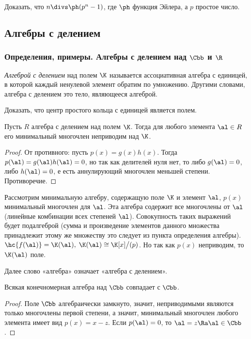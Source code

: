 \documentclass[a4paper]{article}
\begin{document}
\begin{problem}
Доказать, что $n \divs \ph(p^n-1)$, где $\ph$ функция Эйлера, а $p$ простое число.
\end{problem}

\subsection{Алгебры с делением}

\subsubsection{Определения, примеры. Алгебры с делением над $\Cbb$ и $\R$}

\begin{df}
\emph{Алгеброй с делением} над полем $\K$ называется ассоциативная алгебра с единицей, в которой каждый
ненулевой элемент обратим по умножению. Другими словами, алгебра с делением это тело, являющееся
алгеброй.
\end{df}

\begin{problem}
Доказать, что центр простого кольца с единицей является полем.
\end{problem}

\begin{stm}
Пусть $R$ алгебра с делением над полем $\K$. Тогда для любого элемента $\al \in R$ его минимальный
многочлен неприводим над $\K$.
\end{stm}
\begin{proof}
От противного: пусть $p(x)=g(x)h(x)$. Тогда $p(\al)=g(\al)h(\al)=0$, но так как делителей нуля нет, то либо $g(\al)=0$, либо
$h(\al)=0$, е есть аннулирующий многочлен меньшей степени. Противоречие.
\end{proof}

Рассмотрим минимальную алгебру, содержащую поле $\K$ и элемент $\al$, $p(x)$ минимальный многочлен
для $\al$. Эта алгебра содержит все многочлены от $\al$ (линейные комбинации всех степеней $\al$).
Совокупность таких выражений будет подалгеброй (сумма и произведение элементов данного множества принадлежит
этому же множеству это следует из пункта  определения алгебры). $\hc{f(\al)}=\K(\al), \;
\K(\al) \cong \K[x]\bigl/(p)$. Но так как $p(x)$ неприводим, то $\K(\al)$ поле.

Далее слово «алгебра» означает «алгебра с делением».

\begin{theorem}
Всякая конечномерная алгебра над $\Cbb$ совпадает с $\Cbb$.
\end{theorem}
\begin{proof}
Поле $\Cbb$ алгебраически замкнуто, значит, неприводимыми являются только многочлены первой степени, а
значит, минимальный многочлен любого элемента имеет вид $p(x)=x-z$. Если $p(\al)=0$, то $\al = z \Ra
\al \in \Cbb$.
\end{proof}
\end{document}
